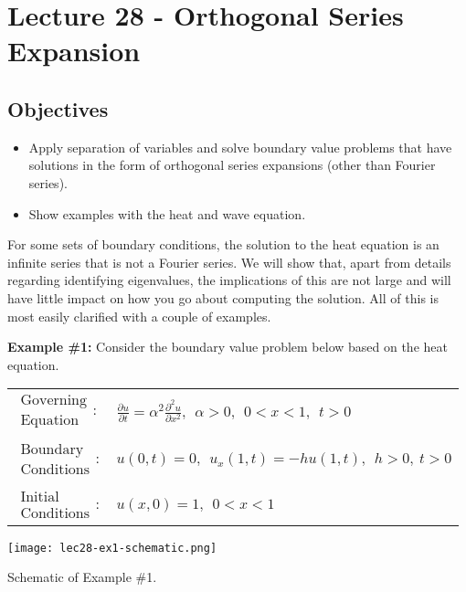 \chapter{Lecture 28 - Orthogonal Series Expansion}
\label{ch:lec28}
\section{Objectives}
\begin{itemize}
\item Apply separation of variables and solve boundary value problems that have solutions in the form of orthogonal series expansions (other than Fourier series).
\item Show examples with the heat and wave equation.
\end{itemize}
\setcounter{lstannotation}{0} %

For some sets of boundary conditions, the solution to the heat equation is an infinite series that is not a Fourier series.  We will show that, apart from details regarding identifying eigenvalues, the implications of this are not large and will have little impact on how you go about computing the solution.  All of this is most easily clarified with a couple of examples.

\vspace{0.3cm}

\noindent\textbf{Example \#1:}  Consider the boundary value problem below based on the heat equation.
\begin{table}
\begin{tabular}{l l}
$\substack{\text{Governing} \\\text{Equation}}: $& $\frac{\partial u}{\partial t} = \alpha^2 \frac{\partial^2 u}{\partial x^2},  \ \ \alpha>0, \ \ 0<x<1, \ \ t>0$ \\
& \\
$\substack{\text{Boundary} \\ \text{Conditions}}: $& $u(0,t)=0, \ \ u_x(1,t) = -hu(1,t), \ \ h>0, \  t>0$\\
& \\
$\substack{\text{Initial} \\ \text{Conditions}}: $ & $u(x,0) = 1, \ \ 0<x<1 $ \\
\end{tabular}
\end{table}
\begin{marginfigure}
\texttt{[image: lec28-ex1-schematic.png]}
\caption{Schematic of Example \#1.}
\label{fig:lec28-ex1-schematic}
\end{marginfigure}

